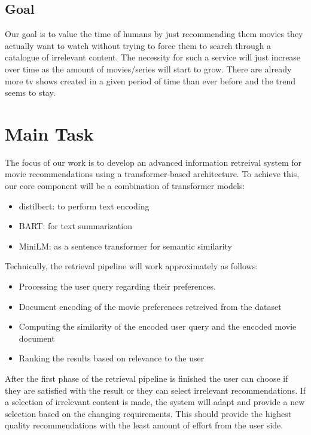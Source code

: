 \documentclass[12pt,a4paper]{article}
\begin{document}
  \subsection{Goal}
  Our goal is to value the time of humans by just recommending them movies they actually want to watch without trying to force them to search through a catalogue of irrelevant content.
  The necessity for such a service will just increase over time as the amount of movies/series will start to grow.
  There are already more tv shows created in a given period of time than ever before and the trend seems to stay.

  \section{Main Task}

  The focus of our work is to develop an advanced information retreival system for movie recommendations using a transformer-based architecture.
  To achieve this, our core component will be a combination of transformer models:
  \begin{itemize}
    \item distilbert: to perform text encoding
    \item BART: for text summarization
    \item MiniLM: as a sentence transformer for semantic similarity
  \end{itemize}

  \noindent Technically, the retrieval pipeline will work approximately as follows:
  \begin{itemize}
    \item Processing the user query regarding their preferences.
    \item Document encoding of the movie preferences retreived from the dataset
    \item Computing the similarity of the encoded user query and the encoded movie document
    \item Ranking the results based on relevance to the user
  \end{itemize}

  \noindent After the first phase of the retrieval pipeline is finished the user can choose if they are satisfied with the result or they can select irrelevant recommendations.
  If a selection of irrelevant content is made, the system will adapt and provide a new selection based on the changing requirements.
  This should provide the highest quality recommendations with the least amount of effort from the user side.
\end{document}
